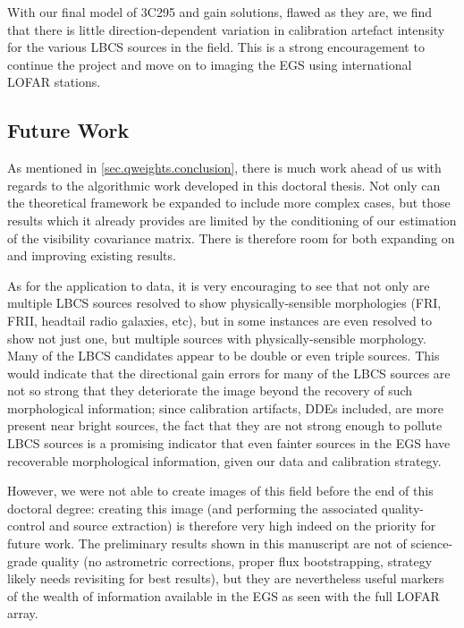 \pg
With our final model of 3C295 and gain solutions, flawed as they are, we find that there is little direction-dependent variation in calibration artefact intensity for the various LBCS sources in the field. This is a strong encouragement to continue the project and move on to imaging the EGS using international LOFAR stations.

\subsection{Future Work}

\pg
As mentioned in \cref{sec.qweights.conclusion}, there is much work ahead of us with regards to the algorithmic work developed in this doctoral thesis. Not only can the theoretical framework be expanded to include more complex cases, but those results which it already provides are limited by the conditioning of our estimation of the visibility covariance matrix. There is therefore room for both expanding on and improving existing results.

\pg
As for the application to data, it is very encouraging to see that not only are multiple LBCS sources resolved to show physically-sensible morphologies (FRI, FRII, headtail radio galaxies, etc), but in some instances are even resolved to show not just one, but multiple sources with physically-sensible morphology. Many of the LBCS candidates appear to be double or even triple sources. This would indicate that the directional gain errors for many of the LBCS sources are not so strong that they deteriorate the image beyond the recovery of such morphological information; since calibration artifacts, DDEs included, are more present near bright sources, the fact that they are not strong enough to pollute LBCS sources is a promising indicator that even fainter sources in the EGS have recoverable morphological information, given our data and calibration strategy.

\pg
However, we were not able to create images of this field before the end of this doctoral degree: creating this image (and performing the associated quality-control and source extraction) is therefore very high indeed on the priority for future work. The preliminary results shown in this manuscript are not of science-grade quality (no astrometric corrections, proper flux bootstrapping, strategy likely needs revisiting for best results), but they are nevertheless useful markers of the wealth of information available in the EGS as seen with the full LOFAR array. %


